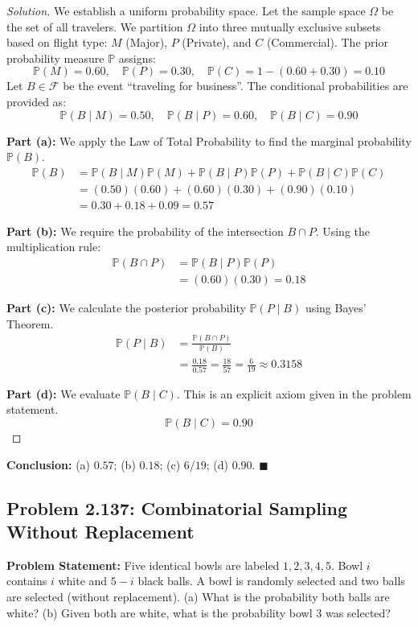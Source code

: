 \documentclass[11pt]{article}
\theoremstyle{definition}
\theoremstyle{plain}
\theoremstyle{remark}
\newcommand{\F}{\mathcal{F}}
\renewcommand{\P}{\mathbb{P}}
\newcommand{\1}{\mathbf{1}}
\begin{document}
\begin{proof}[Solution]
We establish a uniform probability space. Let the sample space $\Omega$ be the set of all travelers. We partition $\Omega$ into three mutually exclusive subsets based on flight type: $M$ (Major), $P$ (Private), and $C$ (Commercial). 
The prior probability measure $\P$ assigns:
\[ \P(M) = 0.60, \quad \P(P) = 0.30, \quad \P(C) = 1 - (0.60 + 0.30) = 0.10 \]
Let $B \in \F$ be the event ``traveling for business''. The conditional probabilities are provided as:
\[ \P(B \mid M) = 0.50, \quad \P(B \mid P) = 0.60, \quad \P(B \mid C) = 0.90 \]

\textbf{Part (a):} We apply the Law of Total Probability to find the marginal probability $\P(B)$.
\begin{align*}
\P(B) &= \P(B \mid M)\P(M) + \P(B \mid P)\P(P) + \P(B \mid C)\P(C) \\
      &= (0.50)(0.60) + (0.60)(0.30) + (0.90)(0.10) \\
      &= 0.30 + 0.18 + 0.09 = 0.57
\end{align*}

\textbf{Part (b):} We require the probability of the intersection $B \cap P$. Using the multiplication rule:
\begin{align*}
\P(B \cap P) &= \P(B \mid P) \P(P) \\
             &= (0.60)(0.30) = 0.18
\end{align*}

\textbf{Part (c):} We calculate the posterior probability $\P(P \mid B)$ using Bayes' Theorem.
\begin{align*}
\P(P \mid B) &= \frac{\P(B \cap P)}{\P(B)} \\
             &= \frac{0.18}{0.57} = \frac{18}{57} = \frac{6}{19} \approx 0.3158
\end{align*}

\textbf{Part (d):} We evaluate $\P(B \mid C)$. This is an explicit axiom given in the problem statement.
\[ \P(B \mid C) = 0.90 \]
\end{proof}
\textbf{Conclusion:} (a) $0.57$; (b) $0.18$; (c) $6/19$; (d) $0.90$. $\blacksquare$

\subsection{Problem 2.137: Combinatorial Sampling Without Replacement}
\textbf{Problem Statement:}
Five identical bowls are labeled $1, 2, 3, 4, 5$. Bowl $i$ contains $i$ white and $5 - i$ black balls. A bowl is randomly selected and two balls are selected (without replacement).
(a) What is the probability both balls are white?
(b) Given both are white, what is the probability bowl 3 was selected?
\end{document}
